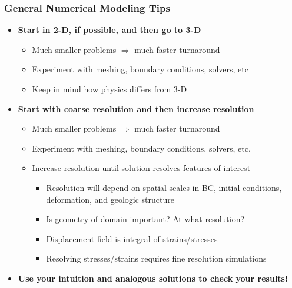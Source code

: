\documentclass{beamer}
\newcommand{\important}[1]{{\bf\color{red}#1}}
\begin{document}
\begin{frame}
  \frametitle{General Numerical Modeling Tips}
  
  \begin{itemize}
  \item \important{Start in 2-D, if possible, and then go to 3-D}
    \begin{itemize}
    \item Much smaller problems $\Rightarrow$ much faster turnaround
    \item Experiment with meshing, boundary conditions, solvers, etc
    \item Keep in mind how physics differs from 3-D
    \end{itemize}
  \item \important{Start with coarse resolution and then increase resolution}
    \begin{itemize}
    \item Much smaller problems $\Rightarrow$ much faster turnaround
    \item Experiment with meshing, boundary conditions, solvers, etc.
    \item Increase resolution until solution resolves features of interest
      \begin{itemize}
      \item Resolution will depend on spatial scales in BC, initial
        conditions, deformation, and geologic structure
      \item Is geometry of domain important? At what resolution?
      \item Displacement field is integral of strains/stresses
      \item Resolving stresses/strains requires fine resolution simulations
      \end{itemize}
    \end{itemize}
  \item \important{Use your intuition and analogous solutions to check
      your results!}
  \end{itemize}
  
\end{frame}
\end{document}
